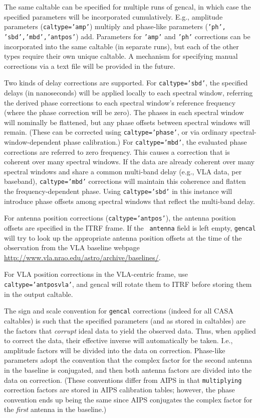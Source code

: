 The same caltable can be specified for multiple runs of gencal, in
which case the specified parameters will be incorporated cumulatively.
E.g., amplitude parameters ({\tt caltype='amp'}) multiply and
phase-like parameters ({\tt 'ph', 'sbd','mbd','antpos'}) add.
Parameters for {\tt 'amp'} and {\tt 'ph'} corrections can be
incorporated into the same caltable (in separate runs), but each of
the other types require their own unique caltable.  A mechanism for
specifying manual corrections via a text file will be provided in the
future.

Two kinds of delay corrections are supported.  For {\tt caltype='sbd'},
the specified delays (in nanoseconds) will be applied locally to 
each spectral window, referring the derived phase corrections to
each spectral window's reference frequency (where the phase correction
will be zero).  The phases in each spectral window will nominally be
flattened, but any phase offsets between spectral windows will remain.
(These can be corrected using {\tt caltype='phase'}, or via ordinary
spectral-window-dependent phase calibration.)  For {\tt caltype='mbd'},
the evaluated phase corrections are referred to zero frequency.  This
causes a correction that is coherent over many spectral windows. 
If the data are already coherent over many spectral windows and share
a common multi-band delay (e.g., VLA data, per baseband), {\tt caltype='mbd'} 
corrections will maintain this coherence and flatten the 
frequency-dependent phase.  Using {\tt caltype='sbd'} in this instance
will introduce phase offsets among spectral windows that reflect
the multi-band delay.  

For antenna position corrections ({\tt caltype='antpos'}), the antenna
position offsets are specified in the ITRF frame.  If the {\tt
  antenna} field is left empty, {\tt gencal} will try to look up the
appropriate antenna position offsets at the time of the observation
from the VLA baseline webpage
\url{http://www.vla.nrao.edu/astro/archive/baselines/}.

For VLA position corrections in the VLA-centric frame, use {\tt
  caltype='antposvla'}, and gencal will rotate them to ITRF before
storing them in the output caltable.

The sign and scale convention for {\tt gencal} corrections (indeed for
all CASA caltables) is such that the specified parameters (and as
stored in caltables) are the factors that {\em corrupt} ideal data to
yield the observed data.  Thus, when applied to correct the data,
their effective inverse will automatically be taken.  I.e., amplitude
factors will be divided into the data on correction.  Phase-like
parameters adopt the convention that the complex factor for the second
antenna in the baseline is conjugated, and then both antenna factors
are divided into the data on correction.  (These conventions differ
from AIPS in that {\tt multiplying} correction factors are stored in
AIPS calibration tables; however, the phase convention ends up being
the same since AIPS conjugates the complex factor for the {\em first}
antenna in the baseline.)

